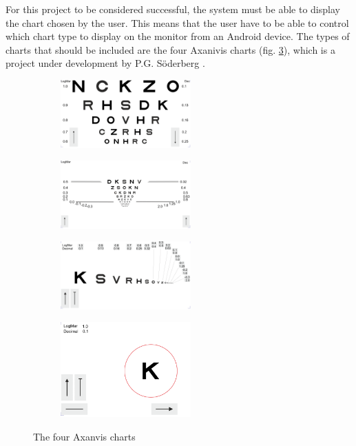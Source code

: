 \documentclass[12pt,a4paper,notitlepage]{report}
\begin{document}
For this project to be considered successful, the system must be able to display the chart chosen by the user. This means that the user have to be able to control which chart type to display on the monitor from an Android device. The types of charts that should be included are the four Axanivis charts (fig. \ref{fig:axanivis}), which is a project under development by P.G. Söderberg \cite{PGSoderbergOral}.

\begin{figure}[ht!]
\centering
\begin{subfigure}{.5\textwidth}
  \centering
  \includegraphics[width=50mm]{images/etdrs_top.png}
  \label{fig:etdrs_upper1}
\end{subfigure}%
\begin{subfigure}{.5\textwidth}
  \centering
  \includegraphics[width=50mm]{images/etdrs_bottom.png}
  \label{fig:etdrs_lower1}
\end{subfigure}
\begin{subfigure}{.4\textwidth}
	\centering
	\includegraphics[width=50mm]{images/etdrs_one_line.png}
\end{subfigure}
\begin{subfigure}{.4\textwidth}
	\centering
	\includegraphics[width=50mm]{images/etdrs_single.png}
\end{subfigure}
\caption{The four Axanvis charts}
\label{fig:axanivis}
\end{figure}
\end{document}
